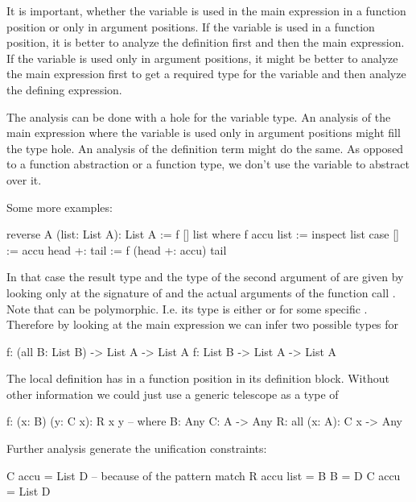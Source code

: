 It is important, whether the variable is used in the main expression in a
function position or only in argument positions. If the variable is used in a
function position, it is better to analyze the definition first and then the
main expression. If the variable is used only in argument positions, it might be
better to analyze the main expression first to get a required type for the
variable and then analyze the defining expression.

The analysis can be done with a hole for the variable type. An analysis of the
main expression where the variable is used only in argument positions might fill
the type hole. An analysis of the definition term might do the same. As opposed
to a function abstraction or a function type, we don't use the variable to
abstract over it.

Some more examples:
\begin{alba}
    reverse A (list: List A): List A :=
        f [] list where
            f accu list :=
                inspect list case
                    [] :=
                        accu
                    head +: tail :=
                        f (head +: accu) tail

\end{alba}
In that case the result type and the type of the second argument of  are
given by looking only at the signature of  and the actual
arguments of the function call . Note that \code{[]} can be
polymorphic. I.e. its type is either  or  for
some specific . Therefore by looking at the main expression we can infer
two possible types for 
\begin{alba}
    f: (all B: List B) -> List A -> List A
    f: List B -> List A -> List A
\end{alba}

The local definition has  in a function position in its definition
block. Without other information we could just use a generic telescope as a type
of 
\begin{alba}
    f: (x: B) (y: C x): R x y
    -- where
    B: Any
    C: A -> Any
    R: all (x: A): C x -> Any
\end{alba}
Further analysis generate the unification constraints:
\begin{alba}
    C accu = List D            -- because of the pattern match
    R accu list = B
    B = D
    C accu = List D

\end{alba}










